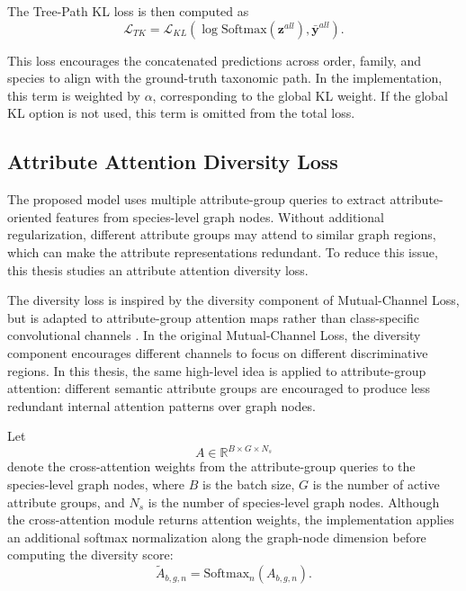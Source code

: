 The Tree-Path KL loss is then computed as
\begin{equation}
    \mathcal{L}_{TK}
    =
    \mathcal{L}_{KL}
    \left(
        \log \mathrm{Softmax}(\mathbf{z}^{all}),
        \bar{\mathbf{y}}^{all}
    \right).
    \label{eq:tk_loss}
\end{equation}

This loss encourages the concatenated predictions across order, family, and species to align with the ground-truth taxonomic path. In the implementation, this term is weighted by \(\alpha\), corresponding to the global KL weight. If the global KL option is not used, this term is omitted from the total loss.

\subsection{Attribute Attention Diversity Loss}

The proposed model uses multiple attribute-group queries to extract attribute-oriented features from species-level graph nodes. Without additional regularization, different attribute groups may attend to similar graph regions, which can make the attribute representations redundant. To reduce this issue, this thesis studies an attribute attention diversity loss.

The diversity loss is inspired by the diversity component of Mutual-Channel Loss, but is adapted to attribute-group attention maps rather than class-specific convolutional channels \cite{Chang_2020}. In the original Mutual-Channel Loss, the diversity component encourages different channels to focus on different discriminative regions. In this thesis, the same high-level idea is applied to attribute-group attention: different semantic attribute groups are encouraged to produce less redundant internal attention patterns over graph nodes.

Let
\begin{equation}
    A
    \in
    \mathbb{R}^{B \times G \times N_s}
\end{equation}
denote the cross-attention weights from the attribute-group queries to the species-level graph nodes, where \(B\) is the batch size, \(G\) is the number of active attribute groups, and \(N_s\) is the number of species-level graph nodes. Although the cross-attention module returns attention weights, the implementation applies an additional softmax normalization along the graph-node dimension before computing the diversity score:
\begin{equation}
    \tilde{A}_{b,g,n}
    =
    \mathrm{Softmax}_{n}(A_{b,g,n}).
\end{equation}

